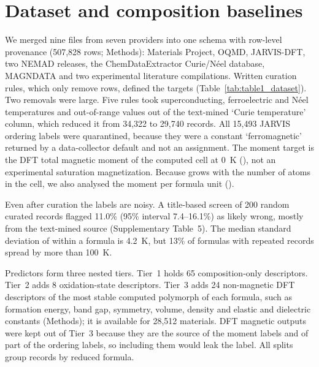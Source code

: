 \documentclass[11pt,a4paper]{article}
\begin{document}
\section*{Dataset and composition baselines}\label{sec:dataset}

We merged nine files from seven providers into one schema with row-level provenance (507,828 rows; Methods): Materials Project\cite{jain2013materials}, OQMD\cite{saal2013oqmd}, JARVIS-DFT\cite{choudhary2020jarvis}, two NEMAD releases\cite{itani2025nemad}, the ChemDataExtractor Curie/N\'eel database\cite{kelly2025curie}, MAGNDATA\cite{gallego2016magndata} and two experimental literature compilations. Written curation rules, which only remove rows, defined the targets (Table~\ref{tab:table1_dataset}). Two removals were large. Five rules took superconducting, ferroelectric and N\'eel temperatures and out-of-range values out of the text-mined `Curie temperature' column, which reduced it from 34,322 to 29,740 records. All 15,493 JARVIS ordering labels were quarantined, because they were a constant `ferromagnetic' returned by a data-collector default and not an assignment. The moment target is the DFT total magnetic moment of the computed cell at 0~K (\mcell{}), not an experimental saturation magnetization. Because \mcell{} grows with the number of atoms in the cell, we also analysed the moment per formula unit (\mfu{}).

Even after curation the \Tc{} labels are noisy. A title-based screen of 200 random curated records flagged 11.0\% (95\% interval 7.4--16.1\%) as likely wrong, mostly from the text-mined source (Supplementary Table~5). The median standard deviation of \Tc{} within a formula is 4.2~K, but 13\% of formulas with repeated records spread by more than 100~K.

Predictors form three nested tiers. Tier~1 holds 65 composition-only descriptors. Tier~2 adds 8 oxidation-state descriptors. Tier~3 adds 24 non-magnetic DFT descriptors of the most stable computed polymorph of each formula, such as formation energy, band gap, symmetry, volume, density and elastic and dielectric constants (Methods); it is available for 28,512 materials. DFT magnetic outputs were kept out of Tier~3 because they are the source of the moment labels and of part of the ordering labels, so including them would leak the label. All splits group records by reduced formula.


\end{document}
